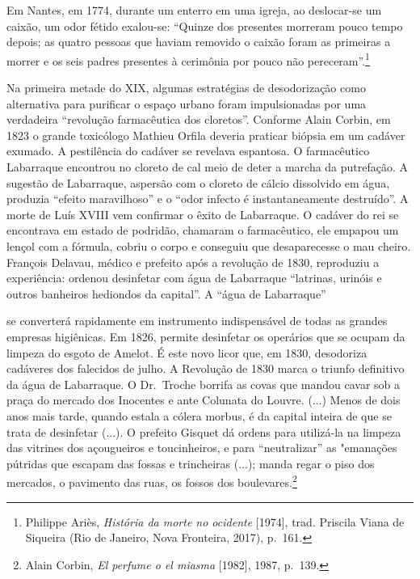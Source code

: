 Em Nantes, em 1774, durante um enterro em uma igreja, ao deslocar-se um
caixão, um odor fétido exalou-se: ``Quinze dos presentes morreram pouco
tempo depois; as quatro pessoas que haviam removido o caixão foram as
primeiras a morrer e os seis padres presentes à cerimônia por pouco não
pereceram''.\footnote{Philippe Ariès, \emph{História da morte no
  ocidente} {[}1974{]}, trad. Priscila Viana de Siqueira (Rio de
  Janeiro, Nova Fronteira, 2017), p.~161.}

Na primeira metade do XIX, algumas estratégias de desodorização como
alternativa para purificar o espaço urbano foram impulsionadas por uma
verdadeira ``revolução farmacêutica dos cloretos''. Conforme Alain
Corbin, em 1823 o grande toxicólogo Mathieu Orfila deveria praticar
biópsia em um cadáver exumado. A pestilência do cadáver se revelava
espantosa. O farmacêutico Labarraque encontrou no cloreto de cal meio de
deter a marcha da putrefação. A sugestão de Labarraque, aspersão com o
cloreto de cálcio dissolvido em água, produzia ``efeito maravilhoso'' e
o ``odor infecto é instantaneamente destruído''. A morte de Luís XVIII
vem confirmar o êxito de Labarraque. O cadáver do rei se encontrava em
estado de podridão, chamaram o farmacêutico, ele empapou um lençol com a
fórmula, cobriu o corpo e conseguiu que desaparecesse o mau
cheiro\emph{.} François Delavau, médico e prefeito após a revolução de
1830, reproduziu a experiência: ordenou desinfetar com água de
Labarraque ``latrinas, urinóis e outros banheiros hediondos da
capital''. A ``água de Labarraque''

se converterá rapidamente em instrumento indispensável de todas as
grandes empresas higiênicas. Em 1826, permite desinfetar os operários
que se ocupam da limpeza do esgoto de Amelot\emph{.} É este novo licor
que, em 1830, desodoriza cadáveres dos falecidos de julho. A Revolução
de 1830 marca o triunfo definitivo da água de Labarraque. O Dr.~Troche
borrifa as covas que mandou cavar sob a praça do mercado dos Inocentes e
ante Colunata do Louvre. (...) Menos de dois anos mais tarde, quando
estala a cólera morbus, é da capital inteira de que se trata de
desinfetar (...). O prefeito Gisquet dá ordens para utilizá-la na
limpeza das vitrines dos açougueiros e toucinheiros, e para
``neutralizar'' as "emanações pútridas que escapam das fossas e
trincheiras (...); manda regar o piso dos mercados, o pavimento das
ruas, os fossos dos boulevares.\footnote{Alain Corbin, \emph{El perfume
  o el miasma} {[}1982{]}, 1987, p.~139.}

